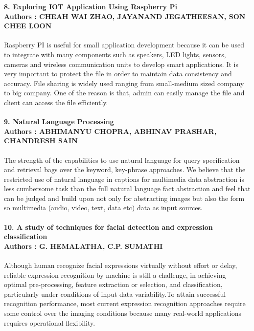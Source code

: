 \documentclass[12pt]{extreport}
\begin{document}
\textbf{8. Exploring IOT Application Using Raspberry Pi}\\
\textbf{Authors : CHEAH WAI ZHAO, JAYANAND JEGATHEESAN, SON CHEE LOON }\\\\
Raspberry PI is useful for small application development because it can be used to integrate with many components such as speakers, LED lights, sensors, cameras and wireless communication units to develop smart applications. It is very important to protect the file in order to maintain data consistency and accuracy. File sharing is widely used ranging from small-medium sized company to big company. One of the reason is that, admin can easily manage the file and client can access the file efficiently.\\\\
\textbf{9. Natural Language Processing}\\
\textbf{Authors : ABHIMANYU CHOPRA, ABHINAV PRASHAR, CHANDRESH SAIN}\\\\
The strength of the capabilities to use natural language for query specification and retrieval bags over the keyword, key-phrase approaches. We believe that the restricted use of natural language in captions for multimedia data abstraction is less cumbersome task than the full natural language fact abstraction and feel that can be judged and build upon not only for abstracting images but also the form so multimedia (audio, video, text, data etc) data as input sources.\\\\
\textbf{10. A study of techniques for facial detection and expression classification}\\
\textbf{Authors : G. HEMALATHA, C.P. SUMATHI}\\\\
Although human recognize facial expressions virtually without effort or delay, reliable expression recognition by machine is still a challenge, in achieving optimal pre-processing, feature extraction or selection, and classification, particularly under conditions of input data variability.To attain successful recognition performance, most current expression recognition approaches require some control over the imaging conditions because many real-world applications requires operational flexibility.\\\\
\end{document}
